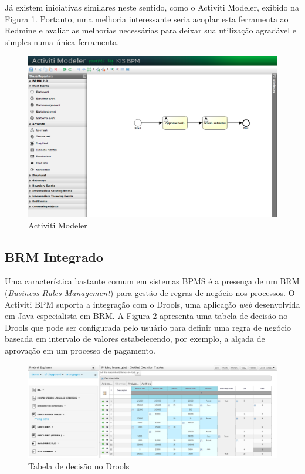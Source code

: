 Já existem iniciativas similares neste sentido, como o Activiti Modeler\cite{activiti_modeler}, exibido na Figura \ref{fig:activiti_modeler}. Portanto, uma melhoria interessante seria acoplar esta ferramenta ao Redmine e avaliar as melhorias necessárias para deixar sua utilização agradável e simples numa única ferramenta.

\begin{figure}[H]
\centering
\includegraphics[width=1\textwidth]{imagens/activiti_modeler.png}
\caption{Activiti Modeler}
\label{fig:activiti_modeler}
\end{figure}

\subsection{BRM Integrado}

Uma característica bastante comum em sistemas BPMS é a presença de um BRM (\textit{Business Rules Management}) para gestão de regras de negócio nos processos. O Activiti BPM suporta a integração com o Drools, uma aplicação \textit{web} desenvolvida em Java especialista em BRM. A Figura \ref{fig:drools} apresenta uma tabela de decisão no Drools que pode ser configurada pelo usuário para definir uma regra de negócio baseada em intervalo de valores estabelecendo, por exemplo, a alçada de aprovação em um processo de pagamento.

\begin{figure}[H]
\centering
\includegraphics[width=1\textwidth]{imagens/drools_decision_table.png}
\caption{Tabela de decisão no Drools}
\label{fig:drools}
\end{figure}


